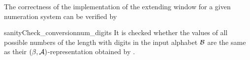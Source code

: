 

The correctness of the implementation of the extending window for a given numeration system can be verified by
 
\begin{method}{sanityCheck\_conversion}{num\_digits}
It is checked whether the values of all possible numbers of the length  with digits in the input alphabet $\mathcal{B}$ are the same as their $(\beta, \mathcal{A})$-representation obtained by .   
\end{method}

